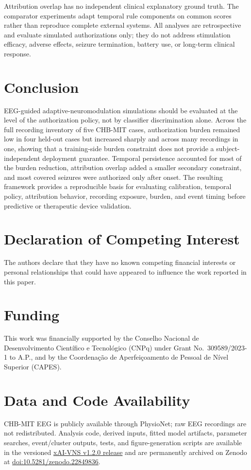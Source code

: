 \documentclass[11pt,a4paper]{article}
\begin{document}
Attribution overlap has no independent clinical explanatory ground truth. The comparator experiments adapt temporal rule components on common scores rather than reproduce complete external systems. All analyses are retrospective and evaluate simulated authorizations only; they do not address stimulation efficacy, adverse effects, seizure termination, battery use, or long-term clinical response.

\section{Conclusion}
EEG-guided adaptive-neuromodulation simulations should be evaluated at the level of the authorization policy, not by classifier discrimination alone. Across the full recording inventory of five CHB-MIT cases, authorization burden remained low in four held-out cases but increased sharply and across many recordings in one, showing that a training-side burden constraint does not provide a subject-independent deployment guarantee. Temporal persistence accounted for most of the burden reduction, attribution overlap added a smaller secondary constraint, and most covered seizures were authorized only after onset. The resulting framework provides a reproducible basis for evaluating calibration, temporal policy, attribution behavior, recording exposure, burden, and event timing before predictive or therapeutic device validation.

\section*{Declaration of Competing Interest}

The authors declare that they have no known competing financial interests or personal relationships that could have appeared to influence the work reported in this paper.

\section*{Funding}

This work was financially supported by the Conselho Nacional de Desenvolvimento Cient\'ifico e Tecnol\'ogico (CNPq) under Grant No.~309589/2023-1 to A.P., and by the Coordena\c{c}\~ao de Aperfei\c{c}oamento de Pessoal de N\'ivel Superior (CAPES).

\section*{Data and Code Availability}
CHB-MIT EEG is publicly available through PhysioNet\citep{guttag2010chbmit}; raw EEG recordings are not redistributed. Analysis code, derived inputs, fitted model artifacts, parameter searches, event/cluster outputs, tests, and figure-generation scripts are available in the versioned \href{https://github.com/squareshorts/xAI-VNS/releases/tag/v1.2.0}{xAI-VNS v1.2.0 release} and are permanently archived on Zenodo at \href{https://doi.org/10.5281/zenodo.22849836}{doi:10.5281/zenodo.22849836}.
\end{document}

